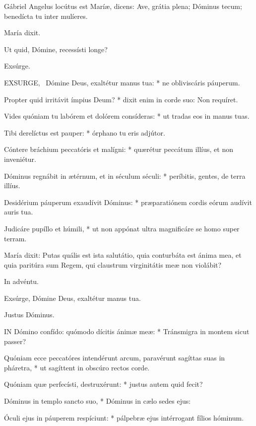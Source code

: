   Gábriel Angelus locútus est Maríæ, dicens: Ave, grátia plena; Dóminus tecum; benedícta tu inter mulíeres.

 María dixit.

  Ut quid, Dómine, recessísti longe?

 Exsúrge. \textdagger


\lettrine[lines=2]{E}{XSURGE}, \textdagger\ Dómine Deus, exaltétur manus tua: * ne obliviscáris páuperum.

Propter quid irritávit ímpius Deum? * dixit enim in corde suo: Non requíret.

Vides quóniam tu labórem et dolórem consíderas: * ut tradas eos in manus tuas.

Tibi derelíctus est pauper: * órphano tu eris adjútor.

Cóntere bráchium peccatóris et malígni: * quærétur peccátum illíus, et non inveniétur.

Dóminus regnábit in ætérnum, et in séculum séculi: * períbitis, gentes, de terra illíus.

Desidérium páuperum exaudívit Dóminus: * præparatiónem cordis eórum audívit auris tua.

Judicáre pupíllo et húmili, * ut non appónat ultra magnificáre se homo super terram.

  María dixit: Putas quális est ista salutátio, quia conturbáta est ánima mea, et quia paritúra sum Regem, qui claustrum virginitátis meæ non violábit?

 In advéntu.

  Exsúrge, Dómine Deus, exaltétur manus tua.

 Justus Dóminus.


\lettrine[lines=2]{I}{N} Dómino confído: quómodo dícitis ánimæ meæ: * Tránsmigra in montem sicut passer?

Quóniam ecce peccatóres intendérunt arcum, paravérunt sagíttas suas in pháretra, * ut sagíttent in obscúro rectos corde.

Quóniam quæ perfecísti, destruxérunt: * justus autem quid fecit?

Dóminus in templo sancto suo, * Dóminus in cælo sedes ejus:

Óculi ejus in páuperem respíciunt: * pálpebræ ejus intérrogant fílios hóminum.

